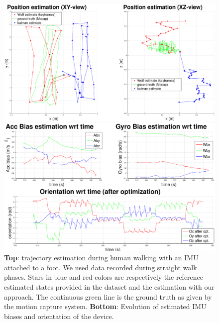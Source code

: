 \begin{figure}[tb]
\centering
\includegraphics[scale=0.182]{figures/experiments/straight_walk/XY_XZ_viewsRotated.eps}
\par\vspace{4mm}
\includegraphics[scale=0.182]{figures/experiments/straight_walk/bias_orientation.eps}
\caption{ 
{\bf Top}: trajectory estimation during human walking with an IMU attached to a foot. We used data recorded during straight walk phases. Stars in blue and red colors are respectively the reference estimated states provided in the dataset and the estimation with our approach.
The continuous green line is the ground truth as given by the motion capture system.
{\bf Bottom}: Evolution of estimated IMU biases and orientation of the device.
}
\label{fig:straight_walk}
\end{figure}




